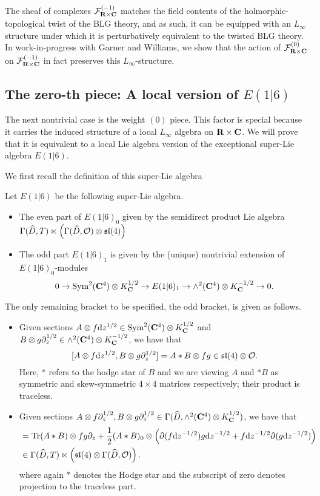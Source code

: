 \documentclass[../main.tex]{subfiles}
\begin{document}
The sheaf of complexes $\mathcal{F}^{(-1)}_{\mathbf{R}\times \mathbf{C}}$ matches the field contents of the holmorphic-topological twist of the BLG theory, and as such, it can be equipped with an $L_\infty$ structure under which it is perturbatively equivalent to the twisted BLG theory. In work-in-progress with Garner and Williams, we show that the action of $\mathcal{F}^{(0)}_{\mathbf{R}\times \mathbf{C}}$ on $\mathcal{F}^{(-1)}_{\mathbf{R}\times \mathbf{C}}$ in fact preserves this $L_\infty$-structure. 

\subsection{The zero-th piece: A local version of $E(1|6)$}
\parsec[] The next nontrivial case is the weight ${(0)}$ piece. This factor is special because it carries the induced structure of a local $L_\infty$ algebra on $\mathbf{R}\times \mathbf{C}$. We will prove that it is equivalent to a local Lie algebra version of the exceptional super-Lie algebra $E(1|6)$. 

We first recall the definition of this super-Lie algebra \cite{KacBible}
\begin{defn}\label{defn:e(1|6)}
Let $E(1|6)$ be the following super-Lie algebra. 
\begin{itemize}
\item The even part of $E(1|6)_0$ given by the semidirect product Lie algebra $\Gamma (\widehat D, T) \ltimes \left( \Gamma (\widehat D, \mathcal{O}) \otimes \mathfrak{sl}(4) \right )$
\item The odd part $E(1|6)_1$ is given by the (unique) nontrivial extension of $E(1|6)_0$-modules 
\[0\to \text{Sym}^2 (\mathbf{C}^4)\otimes K^{1/2}_{\mathbf{C}} \to E(1|6)_1 \to \wedge^2 (\mathbf{C}^4) \otimes K^{-1/2}_{\mathbf{C}} \to 0.\]

\end{itemize}
The only remaining bracket to be specified, the odd bracket, is given as follows.
\begin{itemize}
\item Given sections $A \otimes f \mathrm{d} z^{1/2}\in \text{Sym}^2 (\mathbf{C}^4)\otimes K^{1/2}_{\mathbf{C}}$ and $B\otimes g \partial_z^{1/2}\in \wedge^2 (\mathbf{C}^4)\otimes K^{-1/2}_{\mathbf{C}}$, we have that
\[
[A \otimes f \mathrm{d} z^{1/2}, B\otimes g \partial_z^{1/2}] = A*B \otimes fg \in \mathfrak{sl}(4)\otimes \mathcal{O}.
\]
Here, $*$ refers to the hodge star of $B$ and we are viewing $A$ and $*B$ as symmetric and skew-symmetric $4\times 4$ matrices respectively; their product is traceless. 

\item Given sections $A \otimes f \partial_z^{1/2}, B\otimes g \partial_z^{1/2} \in \Gamma( \widehat D, \wedge^2 (\mathbf{C}^4) \otimes K^{1/2}_{\mathbf{C}})$, we have that 
\begin{align*}
[A\otimes f \d z^{-1/2} , B \otimes g \d z^{-1/2} ] & = \tr (A * B) \otimes fg \del_z + \frac12 (A*B)_0 \otimes \left (\del (f \d z^{-1/2} ) g \d z^{-1/2} + f \d z^{-1/2} \del (g \d z^{-1/2} ) \right ) \\
& \in \Gamma (\hat D, T) \ltimes \left (\mf {sl}(4) \otimes \Gamma (\hat D, \mc O) \right ) .
\end{align*}
where again $*$ denotes the Hodge star and the subscript of zero denotes projection to the traceless part. 
\end{itemize}
\end{defn}
\end{document}
